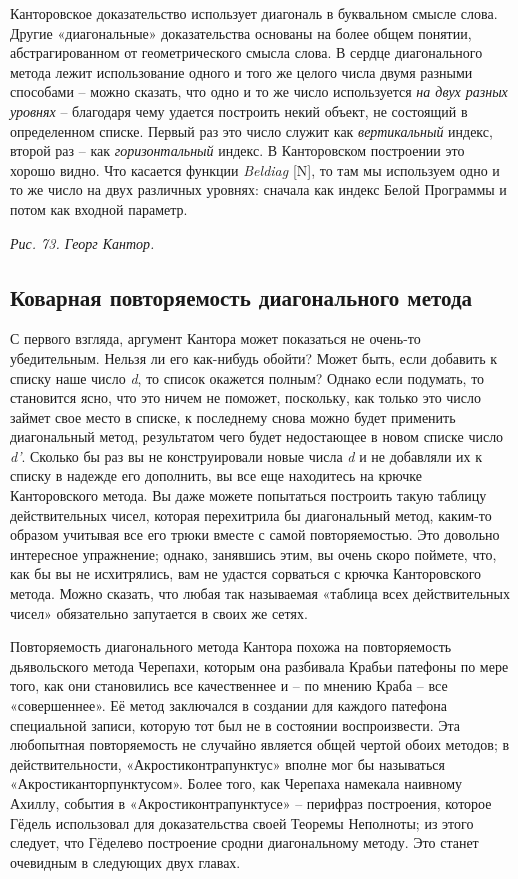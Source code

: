 \documentclass[../main.tex]{subfiles}
\begin{document}
Канторовское доказательство использует диагональ в буквальном смысле слова. Другие «диагональные» доказательства основаны на более общем понятии, абстрагированном от геометрического смысла слова. В сердце диагонального метода лежит использование одного и того же целого числа двумя разными способами \--- можно сказать, что одно и то же число используется \emph{на двух разных уровнях} \--- благодаря чему удается построить некий объект, не состоящий в определенном списке. Первый раз это число служит как \emph{вертикальный} индекс, второй раз \--- как \emph{горизонтальный} индекс. В Канторовском построении это хорошо видно. Что касается функции \emph{Beldiag} {[}N{]}, то там мы используем одно и то же число на двух различных уровнях: сначала как индекс Белой Программы и потом как входной параметр.

\emph{Рис. 73. Георг Кантор.}


\subsection{Коварная повторяемость диагонального метода}

С первого взгляда, аргумент Кантора может показаться не очень-то убедительным. Нельзя ли его как-нибудь обойти? Может быть, если добавить к списку наше число \emph{d}, то список окажется полным? Однако если подумать, то становится ясно, что это ничем не поможет, поскольку, как только это число займет свое место в списке, к последнему снова можно будет применить диагональный метод, результатом чего будет недостающее в новом списке число \emph{d'}. Сколько бы раз вы не конструировали новые числа \emph{d} и не добавляли их к списку в надежде его дополнить, вы все еще находитесь на крючке Канторовского метода. Вы даже можете попытаться построить такую таблицу действительных чисел, которая перехитрила бы диагональный метод, каким-то образом учитывая все его трюки вместе с самой повторяемостью. Это довольно интересное упражнение; однако, занявшись этим, вы очень скоро поймете, что, как бы вы не исхитрялись, вам не удастся сорваться с крючка Канторовского метода. Можно сказать, что любая так называемая «таблица всех действительных чисел» обязательно запутается в своих же сетях.

Повторяемость диагонального метода Кантора похожа на повторяемость дьявольского метода Черепахи, которым она разбивала Крабьи патефоны по мере того, как они становились все качественнее и \--- по мнению Краба \--- все «совершеннее». Её метод заключался в создании для каждого патефона специальной записи, которую тот был не в состоянии воспроизвести. Эта любопытная повторяемость не случайно является общей чертой обоих методов; в действительности, «Акростиконтрапунктус» вполне мог бы называться «Акростиканторпунктусом». Более того, как Черепаха намекала наивному Ахиллу, события в «Акростиконтрапунктусе» \--- перифраз построения, которое Гёдель использовал для доказательства своей Теоремы Неполноты; из этого следует, что Гёделево построение сродни диагональному методу. Это станет очевидным в следующих двух главах.
\end{document}
